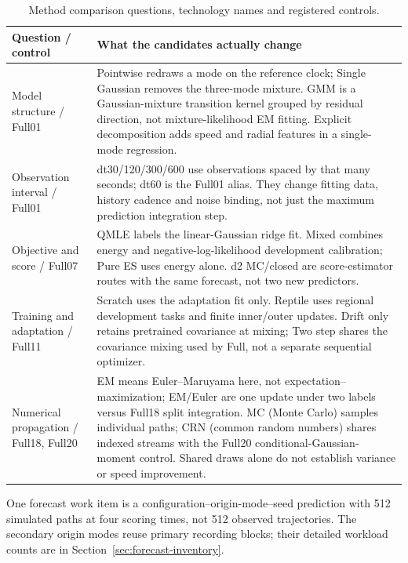 \documentclass[11pt]{article}
\begin{document}
\begingroup
\renewcommand{\topfraction}{.95}
\renewcommand{\textfraction}{.02}
\begin{table}[htbp]
\centering\footnotesize
\caption{Method comparison questions, technology names and registered controls.}
\label{tab:method-reader}
\begin{tabular}{@{}p{.22\linewidth}p{.69\linewidth}@{}}
\toprule
Question / control & What the candidates actually change\\
\midrule
Model structure / Full01 &
Pointwise redraws a mode on the reference clock; Single Gaussian removes the
three-mode mixture. GMM is a Gaussian-mixture transition kernel grouped by
residual direction, not mixture-likelihood EM fitting. Explicit decomposition
adds speed and radial features in a single-mode regression.\\
Observation interval / Full01 &
dt30/120/300/600 use observations spaced by that many seconds; dt60 is the
Full01 alias. They change fitting data, history cadence and noise binding,
not just the maximum prediction integration step.\\
Objective and score / Full07 &
QMLE labels the linear-Gaussian ridge fit. Mixed combines energy and
negative-log-likelihood development calibration; Pure ES uses energy alone.
d2 MC/closed are score-estimator routes with the same forecast, not two new
predictors.\\
Training and adaptation / Full11 &
Scratch uses the adaptation fit only. Reptile uses regional development
tasks and finite inner/outer updates. Drift only retains pretrained
covariance at mixing; Two step shares the covariance mixing used by Full,
not a separate sequential optimizer.\\
Numerical propagation / Full18, Full20 &
EM means Euler--Maruyama here, not expectation--maximization; EM/Euler are
one update under two labels versus Full18 split integration. MC (Monte Carlo)
samples individual paths; CRN (common random numbers) shares indexed streams
with the Full20 conditional-Gaussian-moment control. Shared draws alone do
not establish variance or speed improvement.\\
\bottomrule
\end{tabular}
\end{table}

One forecast work item is a configuration--origin-mode--seed prediction
with 512 simulated paths at four scoring times, not 512 observed trajectories.
The secondary origin modes reuse primary recording blocks; their detailed
workload counts are in Section~\ref{sec:forecast-inventory}.
\end{document}
